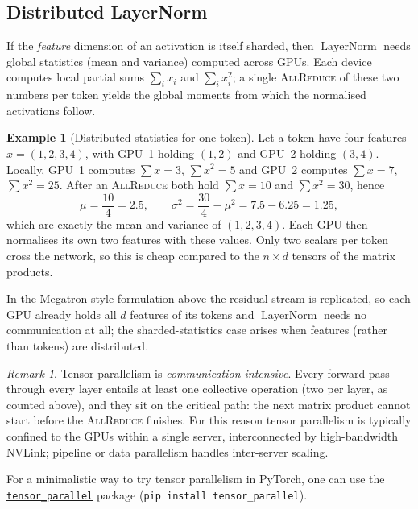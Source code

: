 \documentclass[11pt,a4paper]{article}
\theoremstyle{definition}
\newtheorem{example}[definition]{Example}
\theoremstyle{remark}
\newtheorem*{remark}{Remark}
\theoremstyle{plain}
\DeclareMathOperator{\LayerNorm}{LayerNorm}
\begin{document}
\subsection{Distributed LayerNorm}

If the \emph{feature} dimension of an activation is itself sharded, then
$\LayerNorm$ needs global statistics (mean and variance) computed across
GPUs. Each device computes local partial sums $\sum_i x_i$ and
$\sum_i x_i^2$; a single \textsc{AllReduce} of these two numbers per token
yields the global moments from which the normalised activations follow.

\begin{example}[Distributed statistics for one token]
Let a token have four features $x=(1,2,3,4)$, with GPU~1 holding $(1,2)$
and GPU~2 holding $(3,4)$. Locally,
GPU~1 computes $\sum x=3$, $\sum x^2=5$ and GPU~2 computes $\sum x=7$,
$\sum x^2=25$. After an \textsc{AllReduce} both hold $\sum x=10$ and
$\sum x^2=30$, hence
\[
\mu=\frac{10}{4}=2.5,\qquad
\sigma^2=\frac{30}{4}-\mu^2=7.5-6.25=1.25,
\]
which are exactly the mean and variance of $(1,2,3,4)$. Each GPU then
normalises its own two features with these values. Only two scalars per
token cross the network, so this is cheap compared to the
$n\times d$ tensors of the matrix products.
\end{example}

In the Megatron-style formulation above the residual stream is replicated,
so each GPU already holds all $d$ features of its tokens and
$\LayerNorm$ needs no communication at all; the sharded-statistics case
arises when features (rather than tokens) are distributed.

\label{sec:tp-bandwidth}

\begin{remark}
Tensor parallelism is \emph{communication-intensive}. Every forward pass
through every layer entails at least one collective operation (two per
layer, as counted above), and they sit on the critical path: the next
matrix product cannot start before the \textsc{AllReduce} finishes. For
this reason tensor parallelism is typically confined to the GPUs within a
single server, interconnected by high-bandwidth NVLink; pipeline or data
parallelism handles inter-server scaling.
\end{remark}

For a minimalistic way to try tensor parallelism in PyTorch, one can use the
\href{...}{\texttt{tensor\_parallel}}
package (\texttt{pip install tensor\_parallel}).
\end{document}
